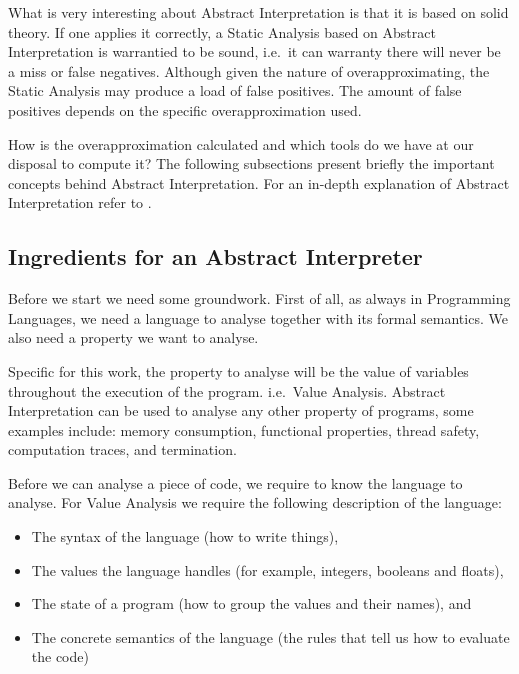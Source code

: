 What is very interesting about Abstract Interpretation is that it is
based on solid theory. If one applies it correctly, a Static Analysis
based on Abstract Interpretation is warrantied to be sound, i.e.~it can
warranty there will never be a miss or false negatives. Although given
the nature of overapproximating, the Static Analysis may produce a load
of false positives. The amount of false positives depends on the
specific overapproximation used.

How is the overapproximation calculated and which tools do we have at
our disposal to compute it? The following subsections present briefly
the important concepts behind Abstract Interpretation. For an in-depth
explanation of Abstract Interpretation refer to \autocites[Chapters 1
and
4]{nielson2015principles}{cousot_abstract_1977}{nipkow_abstract_2014}.

\subsection{Ingredients for an Abstract Interpreter}
\label{ingredients-for-an-abstract-interpreter}

Before we start we need some groundwork. First of all, as always in
Programming Languages, we need a language to analyse together with its
formal semantics. We also need a property we want to analyse.

Specific for this work, the property to analyse will be the value of
variables throughout the execution of the program. i.e.~Value Analysis.
Abstract Interpretation can be used to analyse any other property of
programs, some examples include: memory consumption, functional
properties, thread safety, computation traces, and termination.

Before we can analyse a piece of code, we require to know the language
to analyse. For Value Analysis we require the following description of
the language:

\begin{itemize}
\tightlist
\item
  The syntax of the language (how to write things),
\item
  The values the language handles (for example, integers, booleans and
  floats),
\item
  The state of a program (how to group the values and their names), and
\item
  The concrete semantics of the language (the rules that tell us how to
  evaluate the code)
\end{itemize}

